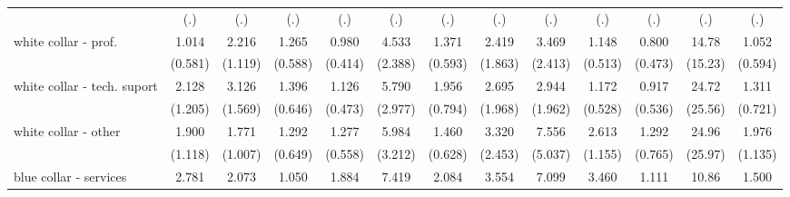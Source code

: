 {\begin{tabular}{l*{12}{c}}
                    &         (.)         &         (.)         &         (.)         &         (.)         &         (.)         &         (.)         &         (.)         &         (.)         &         (.)         &         (.)         &         (.)         &         (.)         \\
[1em]
white collar - prof.&       1.014         &       2.216         &       1.265         &       0.980         &       4.533\sym{**} &       1.371         &       2.419         &       3.469         &       1.148         &       0.800         &       14.78\sym{**} &       1.052         \\
                    &     (0.581)         &     (1.119)         &     (0.588)         &     (0.414)         &     (2.388)         &     (0.593)         &     (1.863)         &     (2.413)         &     (0.513)         &     (0.473)         &     (15.23)         &     (0.594)         \\
[1em]
white collar - tech. suport&       2.128         &       3.126\sym{*}  &       1.396         &       1.126         &       5.790\sym{***}&       1.956         &       2.695         &       2.944         &       1.172         &       0.917         &       24.72\sym{**} &       1.311         \\
                    &     (1.205)         &     (1.569)         &     (0.646)         &     (0.473)         &     (2.977)         &     (0.794)         &     (1.968)         &     (1.962)         &     (0.528)         &     (0.536)         &     (25.56)         &     (0.721)         \\
[1em]
white collar - other&       1.900         &       1.771         &       1.292         &       1.277         &       5.984\sym{***}&       1.460         &       3.320         &       7.556\sym{**} &       2.613\sym{*}  &       1.292         &       24.96\sym{**} &       1.976         \\
                    &     (1.118)         &     (1.007)         &     (0.649)         &     (0.558)         &     (3.212)         &     (0.628)         &     (2.453)         &     (5.037)         &     (1.155)         &     (0.765)         &     (25.97)         &     (1.135)         \\
[1em]
blue collar - services&       2.781         &       2.073         &       1.050         &       1.884         &       7.419\sym{***}&       2.084         &       3.554         &       7.099\sym{**} &       3.460\sym{**} &       1.111         &       10.86\sym{*}  &       1.500         \\

\end{tabular}}
